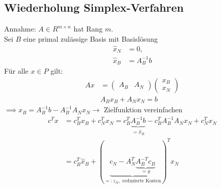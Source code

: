 \subsection{Wiederholung Simplex-Verfahren}
Annahme: $A \in R^{m \times n}$ hat Rang $m$.\\
Sei $B$ eine primal zulässige Basis mit Basislösung
\begin{align*}
	\hat{x}_{N}&=0,\\
	\hat{x}_{B}&= A_{B}^{-1}b
\end{align*}
Für alle $x \in P$ gilt:
\begin{align*}
	Ax&=
	\begin{pmatrix}
		A_{B} & A_{N}
	\end{pmatrix}
	\begin{pmatrix}
		x_{B} \\ x_{N}
	\end{pmatrix}
	\\
	  & A_{B}x_{B} + A_{N}x_{N}= b
\end{align*}
$\implies x_{B} = A_{B}^{-1}b - A_{B}^{-1}A_{N}x_{N} \to$ Zielfunktion vereinfachen
\begin{align*}
	c^Tx&= c_{B}^Tx_{B} + c_{N}^Tx_{N} = c_{B}^T \underbrace{A_{B}^{-1}b}_{= \hat{x}_{B}} - c_{B}^TA_{B}^{-1}A_{N}x_{N} + c_{N}^Tx_{N}\\
		&= c^{T}_{B} \hat{x}_{B} +( \underbrace{ c_{N} - A_{N}^{T} \underbrace{A_{B}^{-T}c_{B}}_{=y} }_{=: z_{N}, \text{ reduzierte Kosten}} )^{T} x_{N}
\end{align*}

